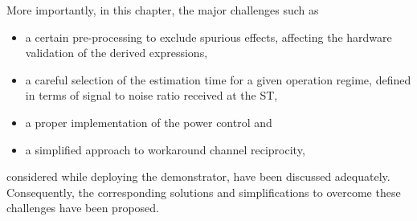 More importantly, in this chapter, the major challenges such as \begin{itemize} \item a certain pre-processing to exclude spurious effects, affecting the hardware validation of the derived expressions, \item a careful selection of the estimation time for a given operation regime, defined in terms of signal to noise ratio received at the ST, \item a proper implementation of the power control and \item a simplified approach to workaround channel reciprocity, \end{itemize} considered while deploying the demonstrator, have been discussed adequately. Consequently, the corresponding solutions and simplifications to overcome these challenges have been proposed.  














